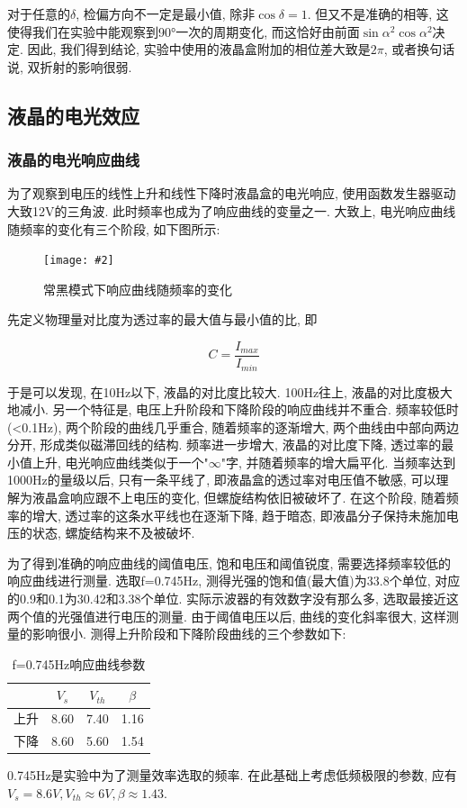\documentclass[12pt,a4paper]{article}
\newcommand{\be}[1]{
    \begin{equation}
        #1
    \end{equation}
}
\newcommand{\bfig}[3]{
    \begin{figure}[H]
        \centering
        \texttt{[image: \#2]}
        \caption{#3}
    \end{figure}
}
\begin{document}
对于任意的$\delta$, 检偏方向不一定是最小值, 除非$\cos{\delta}=1$. 但又不是准确的相等, 这使得我们在实验中能观察到90°一次的周期变化, 而这恰好由前面$\sin{\alpha}^2\cos{\alpha}^2$决定. 因此, 我们得到结论, 实验中使用的液晶盒附加的相位差大致是$2\pi$, 或者换句话说, 双折射的影响很弱. 
\subsection{液晶的电光效应}
\subsubsection{液晶的电光响应曲线}
为了观察到电压的线性上升和线性下降时液晶盒的电光响应, 使用函数发生器驱动大致12V的三角波. 此时频率也成为了响应曲线的变量之一. 大致上, 电光响应曲线随频率的变化有三个阶段, 如下图所示: 
\bfig{0.8}{响应曲线.jpg}{常黑模式下响应曲线随频率的变化}
先定义物理量对比度为透过率的最大值与最小值的比, 即
\be{C=\frac{I_{max}}{I_{min}}}
于是可以发现, 在10Hz以下, 液晶的对比度比较大. 100Hz往上, 液晶的对比度极大地减小. 另一个特征是, 电压上升阶段和下降阶段的响应曲线并不重合. 频率较低时(<0.1Hz), 两个阶段的曲线几乎重合, 随着频率的逐渐增大, 两个曲线由中部向两边分开, 形成类似磁滞回线的结构. 
频率进一步增大, 液晶的对比度下降, 透过率的最小值上升, 电光响应曲线类似于一个"$\infty$"字, 并随着频率的增大扁平化. 当频率达到1000Hz的量级以后, 只有一条平线了, 即液晶盒的透过率对电压值不敏感, 可以理解为液晶盒响应跟不上电压的变化, 但螺旋结构依旧被破坏了. 在这个阶段, 随着频率的增大, 透过率的这条水平线也在逐渐下降, 趋于暗态, 即液晶分子保持未施加电压的状态, 螺旋结构来不及被破坏. 

为了得到准确的响应曲线的阈值电压, 饱和电压和阈值锐度, 需要选择频率较低的响应曲线进行测量. 
选取f=0.745Hz, 测得光强的饱和值(最大值)为33.8个单位, 对应的0.9和0.1为30.42和3.38个单位. 实际示波器的有效数字没有那么多, 选取最接近这两个值的光强值进行电压的测量. 由于阈值电压以后, 曲线的变化斜率很大, 这样测量的影响很小. 
测得上升阶段和下降阶段曲线的三个参数如下:
\begin{table}[H]
    \centering
    \begin{tabular}{|c|c|c|c|}
    \hline
       & $V_s$   & $V_{th}$  & $\beta$ \\ \hline
    上升 & 8.60 & 7.40 & 1.16 \\ \hline
    下降 & 8.60 & 5.60 & 1.54 \\ \hline
    \end{tabular}
    \caption{f=0.745Hz响应曲线参数}
    \end{table}
0.745Hz是实验中为了测量效率选取的频率. 在此基础上考虑低频极限的参数, 应有$V_s=8.6V, V_{th}\approx 6V, \beta\approx 1.43$. 
\end{document}

